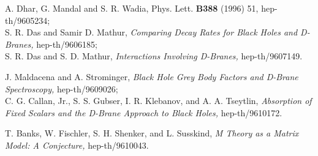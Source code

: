 \documentclass[12pt]{article}
\begin{document}
\begin{thebibliography}{99}
A. Dhar, G. Mandal and S. R. Wadia, Phys. Lett. {\bf B388} (1996) 51,
hep-th/9605234;\\
S. R. Das and Samir D. Mathur, {\it Comparing Decay Rates for Black Holes and
D-Branes,} hep-th/9606185;\\
S. R. Das and S. D. Mathur, {\it Interactions Involving D-Branes,}
hep-th/9607149. 

J. Maldacena and A. Strominger, {\it Black Hole Grey Body Factors and D-Brane
Spectroscopy,} hep-th/9609026;\\
C. G. Callan, Jr., S. S. Gubser, I. R. Klebanov, and A. A. Tseytlin,
{\it Absorption of Fixed Scalars and the D-Brane Approach to Black Holes,}
hep-th/9610172.

T. Banks, W. Fischler, S. H. Shenker, and L. Susskind, {\it M Theory as a Matrix
Model: A Conjecture,} hep-th/9610043.

\end{thebibliography}
\end{document}
